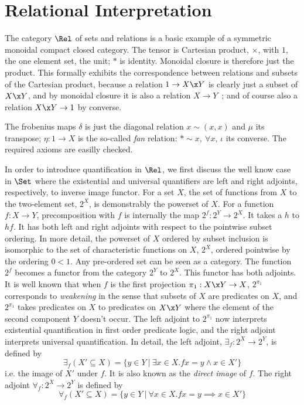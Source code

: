 \section{Relational Interpretation}


The category $\Rel$ of sets and relations is a basic example of a
symmetric monoidal compact closed category. The tensor is Cartesian
product, $\times$, with $1$, the one element set, the unit; $*$ is
identity. Monoidal closure is therefore just the product. This
formally exhibits the correspondence between relations and subsets of
the Cartesian product, because a relation $ 1 \to X \x Y $ is clearly
just a subset of $X \x Y$, and by monoidal closure it
is also a relation $ X \to Y $~; and of course also a relation $X \x Y
\to 1$ by converse.


The frobenius maps $\delta$ is just 
the diagonal relation $x \sim (x,x)$ and $\mu$ its transpose; $\eta : 1
\to X$ is the so-called \emph{fan} relation: $\ast \sim x, ~  \forall
x$, $\iota$ its converse. The required axioms are easilly checked. 


In order to introduce quantification in $\Rel$, we first discuss the
well know case in $\Set$ where the existential and universal
quantifiers are left and right adjoints, respectively, to inverse
image functor.
%
For a set $X$, the set of functions from $X$ to the two-element set,
$2^X$, is demonstrably the powerset of $X$.  For a function $f : X \to
Y$, precomposition with $f$ is internally the map $2^f : 2^Y \to
2^X$. It takes a $h$ to $hf$.  It has both left and right adjoints
with respect to the pointwise subset ordering. In more detail, the
powerset of $X$ ordered by subset inclusion is isomorphic to the set
of characteristic functions on $X$, $2^X$, ordered pointwise by the
ordering $0 < 1$.  Any pre-ordered set can be seen as a category. The
function $2^f$ becomes a functor from the category $2^Y$ to
$2^X$. This functor has both adjoints. It is well known that when $f$
is the first projection $\pi_1 : X\x Y \to X$, $2^{\pi_1}$ corresponds
to \emph{weakening} in the sense that subsets of $X$ are predicates on
$X$, and $2^{\pi_1}$ takes predicates on $X$ to predicates on $X\x Y$
where the element of the second component $Y$ doesn't occur.  The left
adjoint to $2^{\pi_1}$ now interprets existential quantification in first
order predicate logic, and the right adjoint interprets universal
quantification. In detail, 
the left adjoint, $\exists_f : 2^X \to 2^Y$, is defined by 
\[\exists_f (X' \subseteq X) = \{ y \in Y ~|~ \exists x \in X. f x = y
\wedge x \in X'\} \]
i.e. the image of $X'$ under $f$. It is also known as the
\emph{direct image} of $f$.
The right adjoint $\forall_f : 2^X
\to 2^Y$ is defined by 
%
\[
\forall_f (X' \subseteq X) = \{ y \in Y ~|~ \forall x \in X. f x = y
\implies x \in X' \} \] 
%


